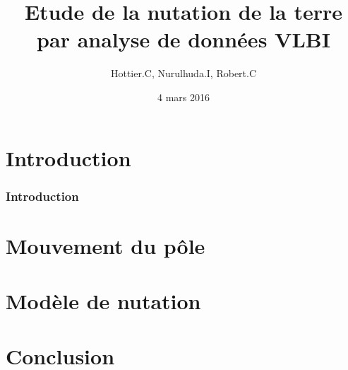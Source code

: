 \documentclass[french]{beamer}
\title[Soutenance MT3]{Etude de la nutation de la terre par analyse de données VLBI}
\author{Hottier.C, Nurulhuda.I, Robert.C}
\date{4 mars 2016}
\newcommand{\frtt}[1]{\frametitle{#1}}
\begin{document}
\begin{frame}
  \maketitle
\end{frame}

\begin{frame}
  \tableofcontents
\end{frame}

\section{Introduction}

\begin{frame}
  \frtt{Introduction}
\end{frame}


\section{Mouvement du pôle}

\section{Modèle de nutation}

\section{Conclusion}
\end{document}
